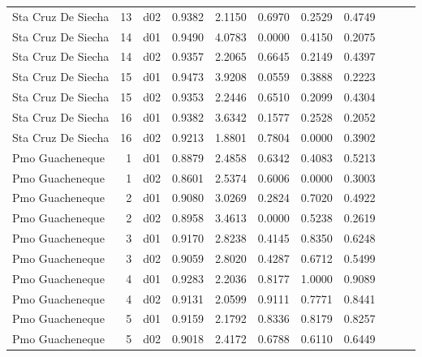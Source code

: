 \begin{landscape}
\begin{longtable}{p{2cm}rrrrrrrrrr}
   Sta Cruz De Siecha  &         13 &     d02 &   0.9382 &  2.1150 &        0.6970 &           0.2529 &  0.4749 \\
   Sta Cruz De Siecha  &         14 &     d01 &   0.9490 &  4.0783 &        0.0000 &           0.4150 &  0.2075 \\
   Sta Cruz De Siecha  &         14 &     d02 &   0.9357 &  2.2065 &        0.6645 &           0.2149 &  0.4397 \\
   Sta Cruz De Siecha  &         15 &     d01 &   0.9473 &  3.9208 &        0.0559 &           0.3888 &  0.2223 \\
   Sta Cruz De Siecha  &         15 &     d02 &   0.9353 &  2.2446 &        0.6510 &           0.2099 &  0.4304 \\
   Sta Cruz De Siecha  &         16 &     d01 &   0.9382 &  3.6342 &        0.1577 &           0.2528 &  0.2052 \\
   Sta Cruz De Siecha  &         16 &     d02 &   0.9213 &  1.8801 &        0.7804 &           0.0000 &  0.3902 \\
      Pmo Guacheneque  &          1 &     d01 &   0.8879 &  2.4858 &        0.6342 &           0.4083 &  0.5213 \\
      Pmo Guacheneque  &          1 &     d02 &   0.8601 &  2.5374 &        0.6006 &           0.0000 &  0.3003 \\
      Pmo Guacheneque  &          2 &     d01 &   0.9080 &  3.0269 &        0.2824 &           0.7020 &  0.4922 \\
      Pmo Guacheneque  &          2 &     d02 &   0.8958 &  3.4613 &        0.0000 &           0.5238 &  0.2619 \\
      Pmo Guacheneque  &          3 &     d01 &   0.9170 &  2.8238 &        0.4145 &           0.8350 &  0.6248 \\
      Pmo Guacheneque  &          3 &     d02 &   0.9059 &  2.8020 &        0.4287 &           0.6712 &  0.5499 \\
      Pmo Guacheneque  &          4 &     d01 &   0.9283 &  2.2036 &        0.8177 &           1.0000 &  0.9089 \\
      Pmo Guacheneque  &          4 &     d02 &   0.9131 &  2.0599 &        0.9111 &           0.7771 &  0.8441 \\
      Pmo Guacheneque  &          5 &     d01 &   0.9159 &  2.1792 &        0.8336 &           0.8179 &  0.8257 \\
      Pmo Guacheneque  &          5 &     d02 &   0.9018 &  2.4172 &        0.6788 &           0.6110 &  0.6449 \\

\end{longtable}
\end{landscape}
